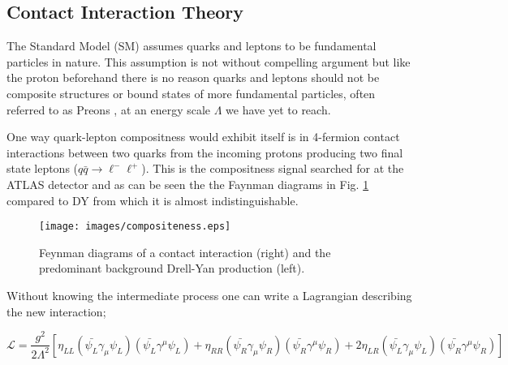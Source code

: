     \subsection{Contact Interaction Theory}

        The Standard Model (SM) assumes quarks and leptons to be fundamental particles in nature. This assumption is not without compelling argument but like the proton beforehand there is no reason quarks and leptons should not be composite structures or bound states of more fundamental particles, often referred to as Preons \cite{Eichten:1983hw}, at an energy scale $\Lambda$ we have yet to reach. 

        One way quark-lepton compositness would exhibit itself is in 4-fermion contact interactions between two quarks from the incoming protons producing two final state leptons ($q\bar{q} \rightarrow \ell^{-}\ell^{+}$). This is the compositness signal searched for at the ATLAS detector and as can be seen the the Faynman diagrams in Fig. \ref{fig:fd} compared to DY from which it is almost indistinguishable.

        \begin{figure}[h]
            \begin{center}
            \texttt{[image: images/compositeness.eps]}
            \end{center}
            \caption{Feynman diagrams of a contact interaction (right) and the predominant background Drell-Yan production (left).}
            \label{fig:fd}
        \end{figure}

        Without knowing the intermediate process one can write a Lagrangian describing the new interaction; 

        \begin{equation}
            \mathcal{L} = \frac{g^{2}}{2\Lambda^{2}}
                [\eta_{LL} (\bar{\psi_{L}}\gamma_{\mu}\psi_{L}) (\bar{\psi_{L}}\gamma^{\mu}\psi_{L}) 
                + \eta_{RR} (\bar{\psi_{R}}\gamma_{\mu}\psi_{R}) (\bar{\psi_{R}}\gamma^{\mu}\psi_{R}) 
                + 2\eta_{LR} (\bar{\psi_{L}}\gamma_{\mu}\psi_{L}) (\bar{\psi_{R}}\gamma^{\mu}\psi_{R}) ]
        \end{equation}

